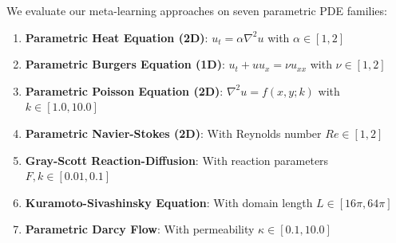 \documentclass[review]{elsarticle}
\begin{document}
We evaluate our meta-learning approaches on seven parametric PDE families:

\begin{enumerate}
\item \textbf{Parametric Heat Equation (2D)}: $u_t = \alpha \nabla^2 u$ with $\alpha \in [1, 2]$~\cite{cai2021physics}
\item \textbf{Parametric Burgers Equation (1D)}: $u_t + u u_x = \nu u_{xx}$ with $\nu \in [1, 2]$~\cite{raissi2019physics}
\item \textbf{Parametric Poisson Equation (2D)}: $\nabla^2 u = f(x,y; k)$ with $k \in [1.0, 10.0]$~\cite{berg2018unified}
\item \textbf{Parametric Navier-Stokes (2D)}: With Reynolds number $Re \in [1, 2]$~\cite{jin2021nsfnets,rao2020physics}
\item \textbf{Gray-Scott Reaction-Diffusion}: With reaction parameters $F, k \in [0.01, 0.1]$~\cite{wight2020solving}
\item \textbf{Kuramoto-Sivashinsky Equation}: With domain length $L \in [16\pi, 64\pi]$~\cite{pathak2018model}
\item \textbf{Parametric Darcy Flow}: With permeability $\kappa \in [0.1, 10.0]$~\cite{sahli2020physics}
\end{enumerate}
\end{document}
